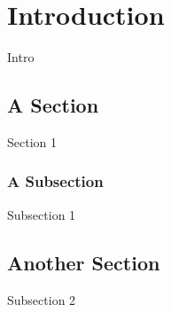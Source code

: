 \chapter{Introduction}

Intro

\section{A Section}

Section 1

\subsection{A Subsection}

Subsection 1

\section{Another Section}

Subsection 2